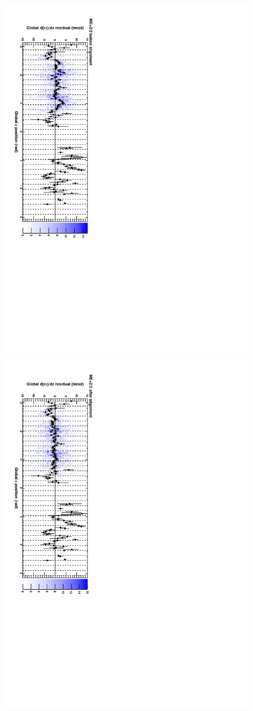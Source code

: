 \documentclass[compress]{beamer}
\begin{document}
\begin{frame}
\includegraphics[height=\linewidth, angle=90]{cscphiy_mep22_before.pdf}

\includegraphics[height=\linewidth, angle=90]{cscphiy_mep22_after.pdf}
\end{frame}
\end{document}
